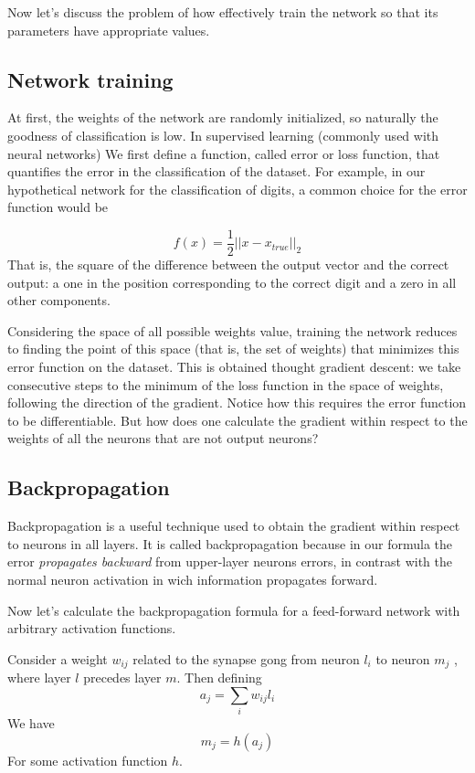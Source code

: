 \documentclass[a4paper]{report}
\begin{document}
Now let's discuss the problem of how effectively train the network so that its parameters have appropriate values.
\subsection{Network training}
At first, the weights of the network are randomly initialized, so naturally the goodness of classification is low. In supervised learning (commonly used with neural networks) We first define a function, called error or loss function, that quantifies the error in the classification of the dataset. For example, in our hypothetical network for the classification of digits, a common choice for the error function would be

\begin{equation}
f(x)=\frac{1}{2}||x-x_{true}||_2
\label{true}
\end{equation}
That is, the square of the difference between the output vector and the correct output: a one in the position corresponding to the correct digit and a zero in all other components.

Considering the space of all possible weights value, training the network reduces to finding the point of this space (that is, the set of weights) that minimizes this error function on the dataset. This is obtained thought gradient descent: we take consecutive steps to the minimum of the loss function in the space of weights, following the direction of the gradient. Notice how this requires the error function to be differentiable. But how does one calculate the gradient within respect to the weights of all the neurons that are not output neurons?

\subsection{Backpropagation}
Backpropagation is a useful technique used to obtain the gradient within respect to neurons in all layers. It is called backpropagation because in our formula the error \textit{propagates backward} from upper-layer neurons errors, in contrast with the normal neuron activation in wich information propagates forward.

Now let's calculate the backpropagation formula for a feed-forward network with arbitrary activation functions.

Consider a weight $w_{ij}$ related to the synapse gong from neuron $l_i$ to neuron $m_j$ , where layer $l$ precedes layer $m$. Then defining
\begin{equation}
a_j = \sum_i w_{ij}l_i
\label{pizza}
\end{equation}
We have
\begin{equation}
m_j = h(a_j)
\label{pizza2}
\end{equation}
For some activation function $h$.
\end{document}
